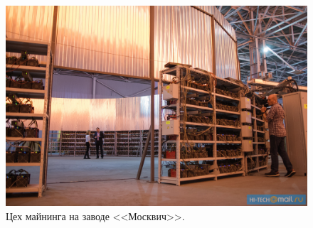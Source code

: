 \documentclass{beamer}
\begin{document}
\begin{frame}

\begin{figure}
\center
\includegraphics[width=\textwidth]{Images/mining01.jpg}
\caption{\label{fig:mine01}Цех майнинга на заводе <<Москвич>>.}
\end{figure}

\end{frame}
\end{document}
